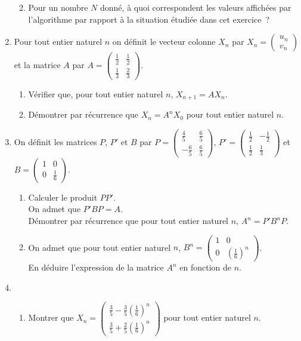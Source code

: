 \documentclass[10pt]{article}
\begin{document}
\begin{enumerate}
\begin{enumerate}
\begin{center}
\end{center}
		\item Pour un nombre $N$ donné, à quoi correspondent les valeurs affichées par l'algorithme par rapport à la situation étudiée dans cet exercice~?
	\end{enumerate}
\item Pour tout entier naturel $n$ on définit le vecteur colonne $X_n$ par $X_n=\begin{pmatrix}
u_n\\v_n
\end{pmatrix}$ et la matrice $A$ par $A=\begin{pmatrix}
\frac12&\frac12\\\frac13&\frac23
\end{pmatrix}$.
	\begin{enumerate}
		\item Vérifier que, pour tout entier naturel $n$, $X_{n+1}= AX_n$.
		\item Démontrer par récurrence que $X_n = A^nX_0$ pour tout entier naturel $n$.
	\end{enumerate}
\item On définit les matrices $P$, $P'$ et $B$ par $P = \begin{pmatrix}
\frac45&\frac65\\-\frac65&\frac65
\end{pmatrix}$, $P'=\begin{pmatrix}
\frac12&-\frac12\\\frac12&\frac13
\end{pmatrix}$ 
et $B=\begin{pmatrix}
1&0\\0&\frac16
\end{pmatrix}$.
	\begin{enumerate}
		\item
Calculer le produit $PP'$.\\
On admet que $P'BP=A$.\\
Démontrer par récurrence que pour tout entier naturel $n$, $A^n=P'B^nP$.
		\item On admet que pour tout entier naturel $n$, $B^n=\begin{pmatrix}
1&0\\0&\left(\frac16\right)^n
\end{pmatrix}$.\\
En déduire l'expression de la matrice $A^n$ en fonction de $n$.
	\end{enumerate}
\item 
	\begin{enumerate}
		\item Montrer que $X_n=\begin{pmatrix}
\frac35-\frac35\left(\frac16\right)^n\\
\frac35+\frac25\left(\frac16\right)^n
\end{pmatrix}$ pour tout entier naturel $n$.


\end{enumerate}
\end{enumerate}
\end{document}
